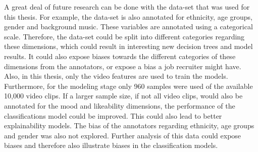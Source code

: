 A great deal of future research can be done with the data-set that was used for this thesis. For example, the data-set is also annotated for ethnicity, age groups, gender and background music. These variables are annotated using a categorical scale. Therefore, the data-set could be split into different categories regarding these dimensions, which could result in interesting new decision trees and model results. It could also expose biases towards the different categories of these dimensions from the annotators, or expose a bias a job recruiter might have. Also, in this thesis, only the video features are used to train the models. Furthermore, for the modeling stage only 960 samples were used of the available 10,000 video clips. If a larger sample size, if not all video clips, would also be annotated for the mood and likeability dimensions, the performance of the classifications model could be improved. This could also lead to better explainability models. The bias of the annotators regarding ethnicity, age groups and gender was also not explored. Further analysis of this data could expose biases and therefore also illustrate biases in the classification models. 